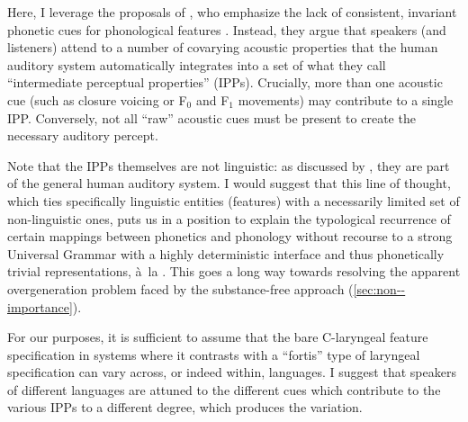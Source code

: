 Here, I leverage the proposals of \citet{phon-knowledge,kingston95:_inter,kingston08}, who emphasize  the lack of consistent, invariant phonetic cues for phonological features \citep[\cf also \egm][]{stevens81,lisker86:_voicin_englis}. Instead, they argue that speakers (and listeners) attend to a number of covarying acoustic properties that the human auditory system automatically integrates into a set of what they call \enquote{intermediate perceptual properties} (IPPs). Crucially, more than one acoustic cue (such as closure voicing or F$_{0}$ and F$_{1}$ movements) may contribute to a single IPP.  Conversely, not all \enquote{raw} acoustic cues must be present to create the necessary auditory percept.

Note that the IPPs themselves are not linguistic: as discussed by \citet{kingston08}, they are part of the general human auditory system. I would suggest that this line of thought, which ties specifically linguistic entities (features) with a necessarily limited set of non\hyp linguistic ones, puts us in a position to explain the typological recurrence of certain mappings between phonetics and phonology without recourse to a strong Universal Grammar with a highly deterministic interface and thus phonetically trivial representations, à~la \citet{spe,hale-kissock-reiss,hale-reiss2008}. This goes a long way towards resolving the apparent overgeneration problem faced by the substance-free approach (\cf \cref{sec:non--importance}).

For our purposes, it is sufficient to assume that the bare C-laryngeal feature specification in systems where it contrasts with a \enquote{fortis} type of laryngeal specification can vary across, or indeed within, languages. I suggest that speakers of different languages are attuned to the different cues which contribute to the various IPPs to a different degree, which produces the variation.

